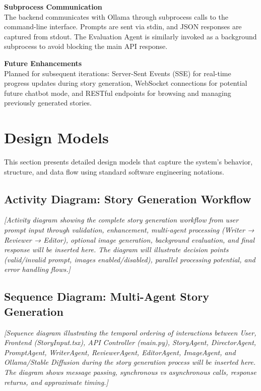 \textbf{Subprocess Communication}\\
The backend communicates with Ollama through subprocess calls to the command-line interface. Prompts are sent via stdin, and JSON responses are captured from stdout. The Evaluation Agent is similarly invoked as a background subprocess to avoid blocking the main API response.

\textbf{Future Enhancements}\\
Planned for subsequent iterations: Server-Sent Events (SSE) for real-time progress updates during story generation, WebSocket connections for potential future chatbot mode, and RESTful endpoints for browsing and managing previously generated stories.

\section{Design Models}
This section presents detailed design models that capture the system's behavior, structure, and data flow using standard software engineering notations.

\subsection{Activity Diagram: Story Generation Workflow}

\vspace{3cm}
\begin{center}
\textit{[Activity diagram showing the complete story generation workflow from user prompt input through validation, enhancement, multi-agent processing (Writer → Reviewer → Editor), optional image generation, background evaluation, and final response will be inserted here. The diagram will illustrate decision points (valid/invalid prompt, images enabled/disabled), parallel processing potential, and error handling flows.]}
\end{center}
\vspace{2cm}

\subsection{Sequence Diagram: Multi-Agent Story Generation}

\vspace{3cm}
\begin{center}
\textit{[Sequence diagram illustrating the temporal ordering of interactions between User, Frontend (StoryInput.tsx), API Controller (main.py), StoryAgent, DirectorAgent, PromptAgent, WriterAgent, ReviewerAgent, EditorAgent, ImageAgent, and Ollama/Stable Diffusion during the story generation process will be inserted here. The diagram shows message passing, synchronous vs asynchronous calls, response returns, and approximate timing.]}
\end{center}
\vspace{2cm}

